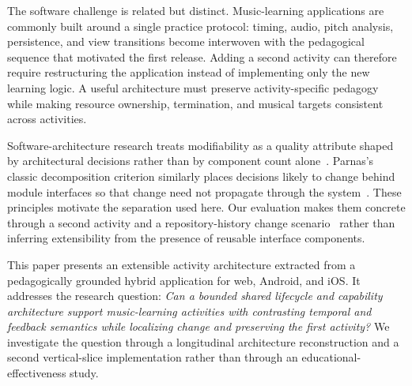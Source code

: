 \documentclass[runningheads]{llncs}
\begin{document}
The software challenge is related but distinct. Music-learning applications
are commonly built around a single practice protocol: timing, audio, pitch
analysis, persistence, and view transitions become interwoven with the
pedagogical sequence that motivated the first release. Adding a second
activity can therefore require restructuring the application instead of
implementing only the new learning logic. A useful architecture must preserve
activity-specific pedagogy while making resource ownership, termination, and
musical targets consistent across activities.

Software-architecture research treats modifiability as a quality attribute
shaped by architectural decisions rather than by component count
alone~\cite{Bass21}. Parnas's classic decomposition criterion similarly places
decisions likely to change behind module interfaces so that change need not
propagate through the system~\cite{Parnas72}. These principles motivate the
separation used here. Our evaluation makes them concrete through a second
activity and a repository-history change scenario~\cite{Bengtsson04} rather than inferring
extensibility from the presence of reusable interface components.

This paper presents an extensible activity architecture extracted from a
pedagogically grounded hybrid application for web, Android, and iOS. It
addresses the research question: \emph{Can a bounded shared lifecycle and
capability architecture support music-learning activities with contrasting
temporal and feedback semantics while localizing change and preserving the
first activity?} We investigate the question through a longitudinal
architecture reconstruction and a second vertical-slice implementation rather
than through an educational-effectiveness study.
\end{document}
